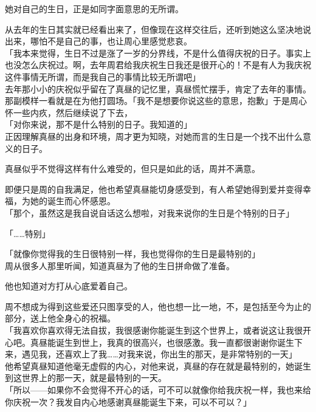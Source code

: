 她对自己的生日，正是如同字面意思的无所谓。

从去年的生日其实就已经看出来了，但像现在这样交往后，还听到她这么坚决地说出来，哪怕不是自己的事，也让周心里感觉悲哀。\\

「我本来觉得，生日不过是涨了一岁的分界线，不是什么值得庆祝的日子。事实上也没怎么庆祝过。啊，去年周君给我庆祝生日我还是很开心的！不是有人为我庆祝这件事情无所谓，而是我自己的事情比较无所谓吧」\\

去年那小小的庆祝似乎留在了真昼的记忆里，真昼慌忙摆手，肯定了去年的事情。\\

那副模样一看就是在为他打圆场。「我不是想要你说这些的意思，抱歉」于是周心怀一些内疚，然后继续说了下去，\\

「对你来说，那不是什么特别的日子。我知道的」\\

正因理解真昼的出身和环境，周才更为知晓，对她而言的生日是一个找不出什么意义的日子。

真昼似乎不觉得这样有什么难受的，但只是如此的话，周并不满意。

即便只是周的自我满足，他也希望真昼能切身感受到，有人希望她得到爱并变得幸福，为她的诞生而心怀感恩。\\

「那个，虽然这是我自说自话这么想啦，对我来说你的生日是个特别的日子」

「……特别」

「就像你觉得我的生日很特别一样，我也觉得你的生日是最特别的」\\

周从很多人那里听闻，知道真昼为了他的生日拼命做了准备。

他也知道对方打从心底爱着自己。

周不想成为得到这些爱还只图享受的人，他也想一比一地，不，是包括至今为止的部分，送上他全身心的祝福。\\

「我喜欢你喜欢得无法自拔，我很感谢你能诞生到这个世界上，或者说这让我很开心吧。真昼能诞生到世上，我真的很高兴，也很感激。我一直都很谢谢你诞生下来，遇见我，还喜欢上了我……对我来说，你出生的那天，是非常特别的一天」\\

他希望真昼知道他毫无虚假的内心，对他来说，真昼的存在就是最特别的，她诞生到这世界上的那一天，就是最特别的一天。\\

「所以——如果你不会觉得不开心的话，可不可以就像你给我庆祝一样，我也来给你庆祝一次？我发自内心地感谢真昼能诞生下来，可以不可以？」\\

